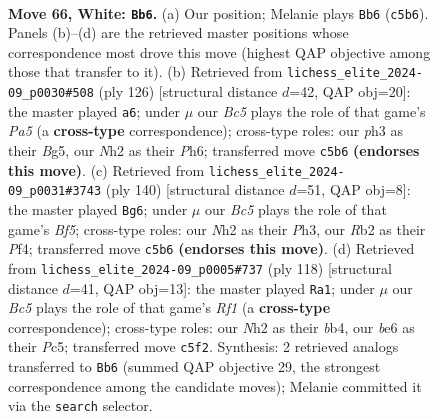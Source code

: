 \documentclass[11pt]{article}
\begin{document}
\clearpage

\begin{figure}[p]\centering
\begin{subfigure}{0.46\textwidth}\centering
\resizebox{\linewidth}{!}{%
\newchessgame
\chessboard[
  setfen={2k5/8/4b3/2B5/PK6/1P3Brp/1R5N/8 w - - 10 66},
  showmover=false,
  pgfstyle=straightmove, color=movearrow, markmove={c5-b6}
]}
\caption{}
\end{subfigure}\hfill
\begin{subfigure}{0.46\textwidth}\centering
\resizebox{\linewidth}{!}{%
\newchessgame
\chessboard[
  setfen={8/7p/1K5P/P3R1B1/4b3/2P2k2/8/3r4 w - - 13 64},
  showmover=false,
  pgfstyle=straightmove, color=movearrow, markmove={a5-a6}
]}
\caption{}
\end{subfigure}
\\[4pt]
\begin{subfigure}{0.46\textwidth}\centering
\resizebox{\linewidth}{!}{%
\newchessgame
\chessboard[
  setfen={3b4/8/8/p1n2B2/5PKN/1k5P/8/8 w - - 1 71},
  showmover=false,
  pgfstyle=straightmove, color=movearrow, markmove={f5-g6}
]}
\caption{}
\end{subfigure}\hfill
\begin{subfigure}{0.46\textwidth}\centering
\resizebox{\linewidth}{!}{%
\newchessgame
\chessboard[
  setfen={8/5k2/8/2P5/1b1B1P2/6P1/p2r4/5RK1 w - - 1 60},
  showmover=false,
  pgfstyle=straightmove, color=movearrow, markmove={f1-a1}
]}
\caption{}
\end{subfigure}
\caption{\textbf{Move 66, White: \texttt{Bb6}.} (a) Our position; Melanie plays \texttt{Bb6} (\texttt{c5b6}). Panels (b)--(d) are the retrieved master positions whose correspondence most drove this move (highest QAP objective among those that transfer to it). (b) Retrieved from \texttt{lichess\_elite\_2024-09\_p0030\#508} (ply 126) [structural distance $d$=42, QAP obj=20]: the master played \texttt{a6}; under $\mu$ our \emph{Bc5} plays the role of that game's \emph{Pa5} (a \textbf{cross-type} correspondence); cross-type roles: our \emph{p}h3 as their \emph{B}g5, our \emph{N}h2 as their \emph{P}h6; transferred move \texttt{c5b6} \textbf{(endorses this move)}. (c) Retrieved from \texttt{lichess\_elite\_2024-09\_p0031\#3743} (ply 140) [structural distance $d$=51, QAP obj=8]: the master played \texttt{Bg6}; under $\mu$ our \emph{Bc5} plays the role of that game's \emph{Bf5}; cross-type roles: our \emph{N}h2 as their \emph{P}h3, our \emph{R}b2 as their \emph{P}f4; transferred move \texttt{c5b6} \textbf{(endorses this move)}. (d) Retrieved from \texttt{lichess\_elite\_2024-09\_p0005\#737} (ply 118) [structural distance $d$=41, QAP obj=13]: the master played \texttt{Ra1}; under $\mu$ our \emph{Bc5} plays the role of that game's \emph{Rf1} (a \textbf{cross-type} correspondence); cross-type roles: our \emph{N}h2 as their \emph{b}b4, our \emph{b}e6 as their \emph{P}c5; transferred move \texttt{c5f2}. Synthesis: 2 retrieved analogs transferred to \texttt{Bb6} (summed QAP objective 29, the strongest correspondence among the candidate moves); Melanie committed it via the \texttt{search} selector.}
\label{fig:thought-m130}
\end{figure}
\end{document}
